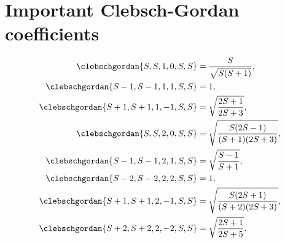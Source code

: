 \section{Important Clebsch-Gordan coefficients}
\label{Sec:appendix_CGC}
\begin{align}
    \clebschgordan{S, S, 1, 0, S, S} &= \frac{S}{\sqrt{S(S+1)}}, \\
    \clebschgordan{S-1, S-1, 1, 1, S, S} &= 1, \\
    \clebschgordan{S+1, S+1, 1, -1, S, S} &= \sqrt{\frac{2S+1}{2S+3}}, \\
    \clebschgordan{S, S, 2, 0, S, S} &= \sqrt{\frac{S(2S-1)}{(S+1)(2S+3)}}, \\
    \clebschgordan{S-1, S-1, 2, 1, S, S} &= \sqrt{\frac{S-1}{S+1}}, \\
    \clebschgordan{S-2, S-2, 2, 2, S, S} &= 1, \\
    \clebschgordan{S+1, S+1, 2, -1, S, S} &= \sqrt{\frac{S(2S+1)}{(S+2)(2S+3)}}, \\
    \clebschgordan{S+2, S+2, 2, -2, S, S} &= \sqrt{\frac{2S+1}{2S+5}}.
\end{align}

